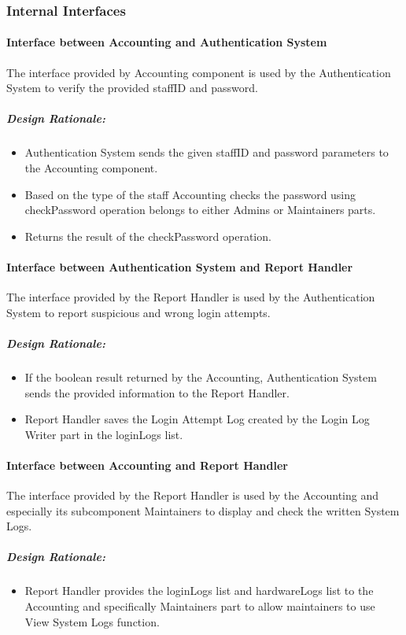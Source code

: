 \subsubsection{Internal Interfaces}
\paragraph{Interface between Accounting and Authentication System}
The interface provided by Accounting component is used by the Authentication System to verify the provided staffID and password.
\subparagraph{Design Rationale:}
\begin{itemize}
	\item Authentication System sends the given staffID and password parameters to the Accounting component.
	\item Based on the type of the staff Accounting checks the password using checkPassword operation belongs to either Admins or Maintainers parts.
	\item Returns the result of the checkPassword operation.
\end{itemize}
\paragraph{Interface between Authentication System and Report Handler}
The interface provided by the Report Handler is used by the Authentication System to report suspicious and wrong login attempts.
\subparagraph{Design Rationale:}
\begin{itemize}
	\item If the boolean result returned by the Accounting, Authentication System sends the provided information to the Report Handler.
	\item Report Handler saves the Login Attempt Log created by the Login Log Writer part in the loginLogs list. 
\end{itemize}
\paragraph{Interface between Accounting and Report Handler}
The interface provided by the Report Handler is used by the Accounting and especially its subcomponent Maintainers to display and check the written System Logs.
\subparagraph{Design Rationale:}
\begin{itemize}
	\item Report Handler provides the loginLogs list and hardwareLogs list to the Accounting and specifically Maintainers part to allow maintainers to use View System Logs function.
\end{itemize}
